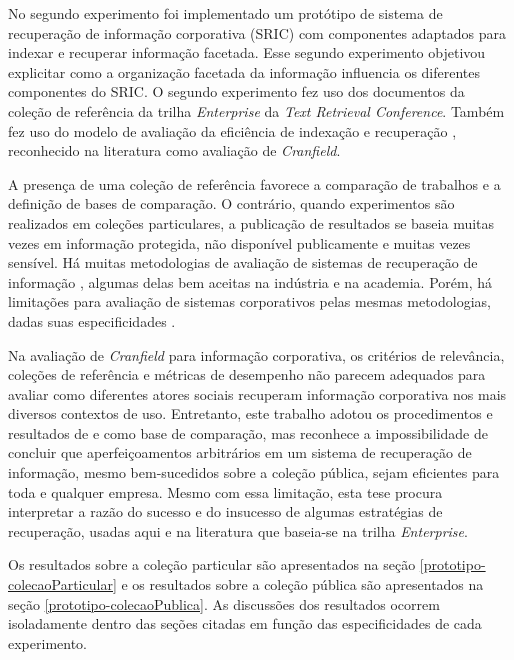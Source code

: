 No segundo experimento foi implementado um protótipo de sistema de recuperação de informação corporativa (SRIC) com componentes adaptados para indexar e recuperar informação facetada. Esse segundo experimento objetivou explicitar como a organização facetada da informação influencia os diferentes componentes do SRIC. O segundo experimento fez uso dos documentos da coleção de referência da trilha \textit{Enterprise} da \textit{Text Retrieval Conference}. Também fez uso do modelo de avaliação da eficiência de indexação e recuperação \cite{balog08}, reconhecido na literatura como avaliação de \textit{Cranfield}.

A presença de uma coleção de referência favorece a comparação de trabalhos e a definição de bases de comparação. O contrário, quando experimentos são realizados em coleções particulares, a publicação de resultados se baseia muitas vezes em informação protegida, não disponível publicamente e muitas vezes sensível. Há muitas metodologias de avaliação de sistemas de recuperação de informação \cite{irEvaluation02,evaluationWithIncompleteInformation04,bucher05,sakai08ret,DBLP:conf/clef/2008}, algumas delas bem aceitas na indústria e na academia. Porém, há limitações para avaliação de sistemas corporativos pelas mesmas metodologias, dadas suas especificidades \cite{craswell05}.

Na avaliação de \textit{Cranfield} para informação corporativa, os critérios de relevância, coleções de referência e métricas de desempenho não parecem adequados para avaliar como diferentes atores sociais recuperam informação corporativa nos mais diversos contextos de uso. Entretanto, este trabalho adotou os procedimentos e resultados de  e  como base de comparação, mas reconhece a impossibilidade de concluir que aperfeiçoamentos arbitrários em um sistema de recuperação de informação, mesmo bem-sucedidos sobre a coleção pública, sejam eficientes para toda e qualquer empresa. Mesmo com essa limitação, esta tese procura interpretar a razão do sucesso e do insucesso de algumas estratégias de recuperação, usadas aqui e na literatura que baseia-se na trilha \textit{Enterprise}.

Os resultados sobre a coleção particular são apresentados na seção \ref{prototipo-colecaoParticular} e os resultados sobre a coleção pública são apresentados na seção \ref{prototipo-colecaoPublica}. As discussões dos resultados ocorrem isoladamente dentro das seções citadas em função das especificidades de cada experimento.









